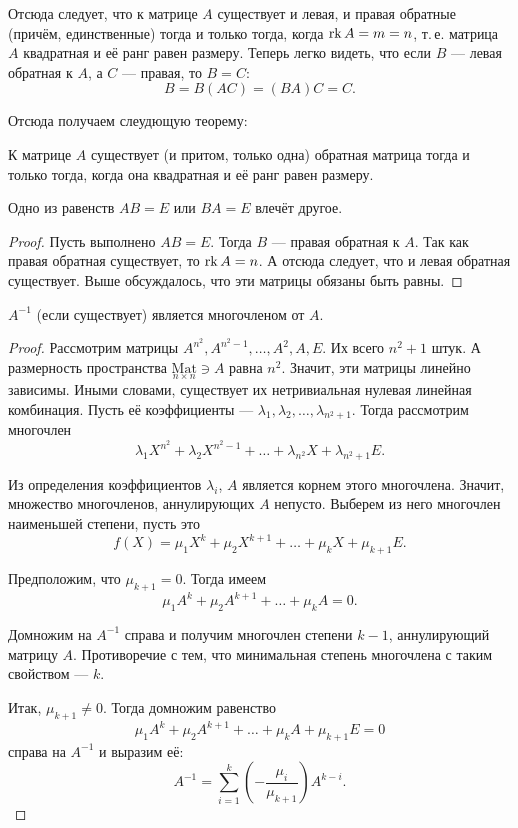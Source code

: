 \begin{remark}
    Отсюда следует, что к матрице $A$ существует и левая, и правая обратные (причём, единственные) тогда и только тогда, когда $\mathrm{rk}\, A = m = n$, т.\,е. матрица $A$ квадратная и её ранг равен размеру. Теперь легко видеть, что если $B$ --- левая обратная к $A$, а $C$ --- правая, то $B = C$:
    $$
    B = B(AC) = (BA)C = C.
    $$

    Отсюда получаем слеудющую теорему:
\end{remark}

\begin{theorem}
    К матрице $A$ существует (и притом, только одна) обратная матрица тогда и только тогда, когда она квадратная и её ранг равен размеру. 
\end{theorem}

\begin{theorem}
    Одно из равенств $AB = E$ или $BA = E$ влечёт другое.
\end{theorem}

\begin{proof}
    Пусть выполнено $AB = E$. Тогда $B$ --- правая обратная к $A$. Так как правая обратная существует, то $\mathrm{rk}\, A = n$. А отсюда следует, что и левая обратная существует. Выше обсуждалось, что эти матрицы обязаны быть равны.
\end{proof}

\begin{statement}
    $A^{-1}$ (если существует) является многочленом от $A$.
\end{statement}

\begin{proof}
    Рассмотрим матрицы $A^{n^2}, A^{n^2 - 1}, \ldots, A^2, A, E$. Их всего $n^2 + 1$ штук. А размерность пространства $\underset{n \times n}{\mathrm{Mat}} \ni A$ равна $n^2$. Значит, эти матрицы линейно зависимы. Иными словами, существует их нетривиальная нулевая линейная комбинация. Пусть её коэффициенты --- $\lambda_1, \lambda_2, \ldots, \lambda_{n^2 + 1}$. Тогда рассмотрим многочлен
    $$
    \lambda_1 X^{n^2} + \lambda_2 X^{n^2 - 1} + \ldots + \lambda_{n^2}X + \lambda_{n^2 + 1}E.
    $$

    Из определения коэффициентов $\lambda_i$, $A$ является корнем этого многочлена. Значит, множество многочленов, аннулирующих $A$ непусто. Выберем из него многочлен наименьшей степени, пусть это
    $$
    f(X) = \mu_1X^k + \mu_2X^{k + 1} + \ldots + \mu_k X + \mu_{k + 1}E.
    $$

    Предположим, что $\mu_{k + 1} = 0$. Тогда имеем
    $$
    \mu_1 A^k + \mu_2 A^{k + 1} + \ldots + \mu_k A = 0.
    $$

    Домножим на $A^{-1}$ справа и получим многочлен степени $k - 1$, аннулирующий матрицу $A$. Противоречие с тем, что минимальная степень многочлена с таким свойством --- $k$. 

    Итак, $\mu_{k + 1} \ne 0$. Тогда домножим равенство
    $$
    \mu_1A^k + \mu_2A^{k + 1} + \ldots + \mu_k A + \mu_{k + 1}E = 0
    $$
    справа на $A^{-1}$ и выразим её:
    $$
    A^{-1} = \sum_{i = 1}^k\left(-\frac{\mu_i}{\mu_{k + 1}}\right)A^{k - i}.
    $$
\end{proof}

